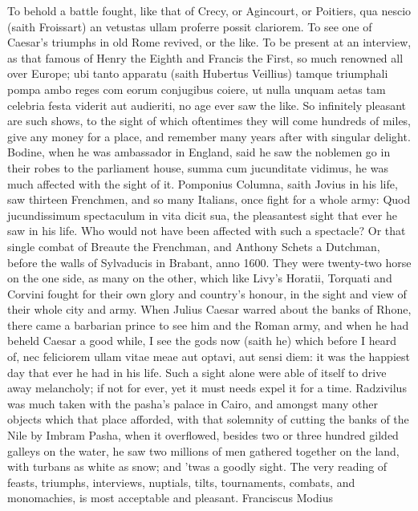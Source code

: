 {To behold a battle fought, like that of Crecy, or Agincourt, or
Poitiers, qua nescio (saith Froissart) an vetustas ullam proferre
possit clariorem. To see one of Caesar's triumphs in old Rome revived,
or the like. To be present at an interview, as that famous of
Henry the Eighth and Francis the First, so much renowned all over
Europe; ubi tanto apparatu (saith Hubertus Veillius) tamque triumphali
pompa ambo reges com eorum conjugibus coiere, ut nulla unquam aetas tam
celebria festa viderit aut audieriti, no age ever saw the like. So
infinitely pleasant are such shows, to the sight of which oftentimes
they will come hundreds of miles, give any money for a place, and
remember many years after with singular delight. Bodine, when he was
ambassador in England, said he saw the noblemen go in their robes to
the parliament house, summa cum jucunditate vidimus, he was much
affected with the sight of it. Pomponius Columna, saith Jovius in his
life, saw thirteen Frenchmen, and so many Italians, once fight for a
whole army: Quod jucundissimum spectaculum in vita dicit sua, the
pleasantest sight that ever he saw in his life. Who would not have been
affected with such a spectacle? Or that single combat of  Breaute
the Frenchman, and Anthony Schets a Dutchman, before the walls of
Sylvaducis in Brabant, anno 1600. They were twenty-two horse on the one
side, as many on the other, which like Livy's Horatii, Torquati and
Corvini fought for their own glory and country's honour, in the sight
and view of their whole city and army. When Julius Caesar warred
about the banks of Rhone, there came a barbarian prince to see him and
the Roman army, and when he had beheld Caesar a good while, I see
the gods now (saith he) which before I heard of, nec feliciorem ullam
vitae meae aut optavi, aut sensi diem: it was the happiest day that
ever he had in his life. Such a sight alone were able of itself to
drive away melancholy; if not for ever, yet it must needs expel it for
a time. Radzivilus was much taken with the pasha's palace in Cairo, and
amongst many other objects which that place afforded, with that
solemnity of cutting the banks of the Nile by Imbram Pasha, when it
overflowed, besides two or three hundred gilded galleys on the water,
he saw two millions of men gathered together on the land, with turbans
as white as snow; and 'twas a goodly sight. The very reading of feasts,
triumphs, interviews, nuptials, tilts, tournaments, combats, and
monomachies, is most acceptable and pleasant.  Franciscus Modius
}
